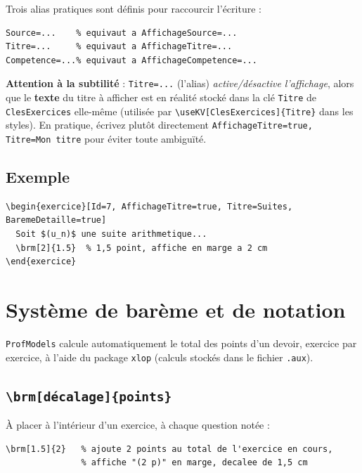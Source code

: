 \documentclass[11pt,a4paper]{article}
\newcommand{\pkg}[1]{\texttt{#1}}
\newcommand{\cmdname}[1]{\texttt{\textbackslash#1}}
\begin{document}
Trois alias pratiques sont définis pour raccourcir l'écriture :

\begin{lstlisting}
Source=...    % equivaut a AffichageSource=...
Titre=...     % equivaut a AffichageTitre=...
Competence=...% equivaut a AffichageCompetence=...
\end{lstlisting}

\begin{avertissement}
\textbf{Attention à la subtilité} : \texttt{Titre=...} (l'alias) \textit{active/désactive l'affichage}, alors que le \textbf{texte} du titre à afficher est en réalité stocké dans la clé \texttt{Titre} de \texttt{ClesExercices} elle-même (utilisée par \cmdname{useKV[ClesExercices]\{Titre\}} dans les styles). En pratique, écrivez plutôt directement \texttt{AffichageTitre=true, Titre=Mon titre} pour éviter toute ambiguïté.
\end{avertissement}

\subsection{Exemple}

\begin{lstlisting}
\begin{exercice}[Id=7, AffichageTitre=true, Titre=Suites, BaremeDetaille=true]
  Soit $(u_n)$ une suite arithmetique...
  \brm[2]{1.5}  % 1,5 point, affiche en marge a 2 cm
\end{exercice}
\end{lstlisting}

\section{Système de barème et de notation}

\pkg{ProfModels} calcule automatiquement le total des points d'un devoir, exercice par exercice, à l'aide du package \pkg{xlop} (calculs stockés dans le fichier \texttt{.aux}).

\subsection{\cmdname{brm[décalage]\{points\}}}

À placer à l'intérieur d'un exercice, à chaque question notée :

\begin{lstlisting}
\brm[1.5]{2}   % ajoute 2 points au total de l'exercice en cours,
               % affiche "(2 p)" en marge, decalee de 1,5 cm
\end{lstlisting}
\end{document}
